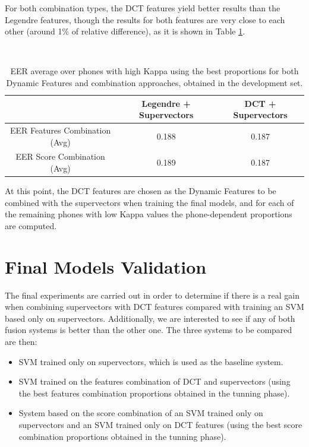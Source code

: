 For both combination types, the DCT features yield better results than the Legendre features,
though the results for both features are very close to each other (around 1\% of relative
difference), as it is shown in Table \ref{table:legendreVsDCTCombinations}.

~

\begin{table}[h]
	\renewcommand{\arraystretch}{1.5}
	\begin{center}
	    \begin{tabular}{ | c | c | c | }
	    \hline
	    & Legendre + Supervectors & DCT + Supervectors \\ \hline
	    EER Features Combination (Avg) & 0.188 & 0.187 \\ \hline
	    EER Score Combination (Avg) & 0.189  & 0.187 \\ \hline
	    \end{tabular}
	    \caption{EER average over phones with high Kappa using the best proportions for
	    both Dynamic Features and combination approaches, obtained in the development set.}
	    \label{table:legendreVsDCTCombinations}
	\end{center}
\end{table}

At this point, the DCT features are chosen as the Dynamic Features to be combined with the
supervectors when training the final models, and for each of the remaining phones with
low Kappa values the phone-dependent proportions are computed.

\section{Final Models Validation} \label{subsection:modelValidation}

The final experiments are carried out in order
to determine if there is a real gain when combining
supervectors with DCT features compared with training an SVM based only on supervectors.
Additionally, we are interested to see if any of both fusion systems is better
than the other one. The three systems to be compared are then:

\begin{itemize}
	\item SVM trained only on supervectors, which is used as the baseline system.
	\item SVM trained on the features combination of DCT and supervectors (using the best features combination proportions obtained in the tunning phase).
	\item System based on the score combination of an SVM trained
	only on supervectors and an SVM trained
	only on DCT features (using the best score combination proportions obtained in the tunning phase).
\end{itemize}

